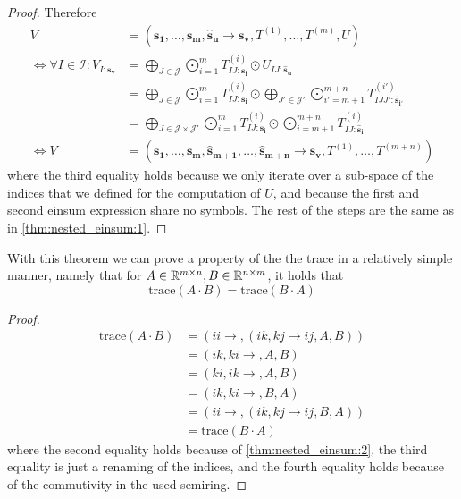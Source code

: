\begin{proof}
    Therefore
    \begin{align*}
        V                                               & = (\bm{s_1},\dots,\bm{s_m}, \bm{\hat{s}_u} \rightarrow \bm{s_v}, T^{(1)},\dots,T^{(m)}, U)                                                                                                                   \\
        \iff \forall I \in \mathcal{I}: V_{I: \bm{s_v}} & = \bigoplus\limits_{J \in \mathcal{J}} \bigodot\limits_{i = 1}^{m} T^{(i)}_{IJ:\bm{s_i}} \odot U_{IJ:\bm{\hat{s}_u}}                                                                                         \\
                                                        & = \bigoplus\limits_{J \in \mathcal{J}} \bigodot\limits_{i = 1}^{m} T^{(i)}_{IJ:\bm{s_i}} \odot \bigoplus\limits_{J' \in \mathcal{J}'} \bigodot\limits_{i' = m + 1}^{m + n} T^{(i')}_{IJJ':\bm{\hat{s}_{i'}}} \\
                                                        & = \bigoplus\limits_{J \in \mathcal{J} \times \mathcal{J}'} \bigodot\limits_{i = 1}^{m} T^{(i)}_{IJ:\bm{s_i}} \odot \bigodot\limits_{i = m + 1}^{m + n} T^{(i)}_{IJ:\bm{\hat{s}_i}}                           \\
        \iff V                                          & = (\bm{s_1}, \dots, \bm{s_m}, \bm{\hat{s}_{m + 1}}, \dots, \bm{\hat{s}_{m + n}} \rightarrow \bm{s_v}, T^{(1)}, \dots, T^{(m + n)})
    \end{align*}
    where the third equality holds because we only iterate over a sub-space of the indices that we defined for the computation of $U$,
    and because the first and second einsum expression share no symbols.
    The rest of the steps are the same as in \autoref{thm:nested_einsum:1}.
\end{proof}

With this theorem we can prove a property of the the trace in a relatively simple manner, namely that for $A \in \mathbb{R}^{m \times n}, B \in \mathbb{R}^{n \times m}$,
it holds that
$$\text{trace}(A \cdot B) = \text{trace}(B \cdot A)$$

\begin{proof}
    \begin{align*}
        \text{trace}(A \cdot B) & = (ii \rightarrow , (ik,kj \rightarrow ij, A, B)) \\
                                & = (ik, ki \rightarrow ,A, B)                      \\
                                & = (ki, ik \rightarrow ,A, B)                      \\
                                & = (ik, ki \rightarrow ,B, A)                      \\
                                & = (ii \rightarrow , (ik,kj \rightarrow ij, B, A)) \\
                                & = \text{trace}(B \cdot A)
    \end{align*}
    where the second equality holds because of \autoref{thm:nested_einsum:2},
    the third equality is just a renaming of the indices,
    and the fourth equality holds because of the commutivity in the used semiring.
\end{proof}

